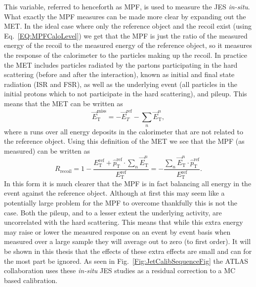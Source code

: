 This variable, referred to henceforth as MPF, is used to measure the JES \textit{in-situ}.  
What exactly the MPF measures can be made more clear by expanding out the MET.  
In the ideal case where only the reference object and the recoil exist (using Eq.~\ref{EQ:MPFCaloLevel}) we get that the MPF is just the ratio of the measured energy of the recoil to the measured energy of the reference object, so it measures the response of the calorimeter to the particles making up the recoil.  
In practice the MET includes particles radiated by the partons participating in the hard scattering (before and after the interaction), known as initial and final state radiation (ISR and FSR), as well as the underlying event (all particles in the initial protons which to not participate in the hard scattering), and pileup.  
This means that the MET can be written as 
\begin{equation}
  \vec{E}_{\mathrm T}^{\mathrm{miss}} = -\vec{E}_{T}^{\mathrm{ref}}-\sum_{n}\vec{E}_{\mathrm T}^{n},
\end{equation}
where n runs over all energy deposits in the calorimeter that are not related to the reference object.  
Using this definition of the MET we see that the MPF (as measured) can be written as 
\begin{equation}
  R_{\mathrm{recoil}}=1-\frac{E_{\mathrm T}^{\mathrm{ref}}+\hat{p}_{\mathrm T}^{\mathrm{ref}}\cdot\sum_{n}\vec{E}_{\mathrm T}^{n}}{E_{\mathrm T}^{\mathrm{ref}}}=-\frac{\sum_{n}\vec{E}_{\mathrm T}^{n}\cdot\hat{p}_{\mathrm T}^{\mathrm{ref}}}{E_{\mathrm T}^{\mathrm{ref}}}.
\end{equation}
In this form it is much clearer that the MPF is in fact balancing all energy in the event against the reference object.  
Although at first this may seem like a potentially large problem for the MPF to overcome thankfully this is not the case.  
Both the pileup, and to a lesser extent the underlying activity, are uncorrelated with the hard scattering.  
This means that while this extra energy may raise or lower the measured response on an event by event basis when measured over a large sample they will average out to zero (to first order).  
It will be shown in this thesis that the effects of these extra effects are small and can for the most part be ignored.  
As seen in Fig.~\ref{Fig:JetCalibSequenceFig} the ATLAS collaboration uses these \textit {in-situ} JES studies as a residual correction to a MC based calibration.  

